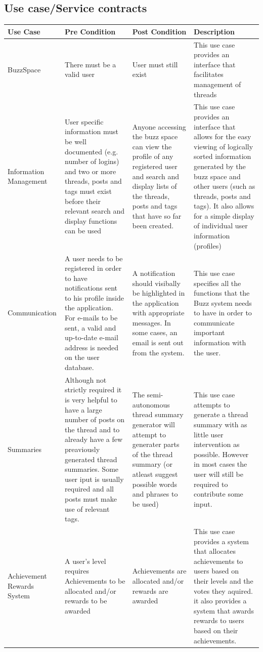 \documentclass[a4paper,12pt]{report}
\begin{document}
\subsection{Use case/Service contracts}
\begin{center}
  \begin{tabular}{| p{3cm} | p{4cm} | p{4cm} | p{4cm} |}
    \hline
    Use Case & Pre Condition & Post Condition & Description \\ \hline \hline
    BuzzSpace & There must be a valid user & User must still exist & This use case provides an interface that facilitates management of threads\\ \hline
    Information Management & User specific information must be well documented (e.g. number of logins) and two or more threads, posts and tags must exist before their relevant search and display functions can be used & Anyone accessing the buzz space can view the profile of any registered user and search and display lists of the threads, posts and tags that have so far been created.  & This use case provides an interface that allows for the easy viewing of logically sorted information generated by the buzz space and other users (such as threads, posts and tags). It also allows for a simple display of individual user information (profiles) \\ \hline
    Communication& A user needs to be registered in order to have notifications sent to his profile inside the application. For e-mails to be sent, a valid and up-to-date e-mail address is needed on the user database. & A notification should visibally be highlighted in the application with appropriate messages. In some cases, an email is sent out from the system. & This use case specifies all the functions that the Buzz system needs to have in order to communicate important information with the user. \\ \hline
    Summaries & Although not strictly required it is very helpful to have a large number of posts on the thread and to already have a few preaviously generated thread summaries. Some user iput is usually required and all posts must make use of relevant tags.  & The semi-autonomous thread summary generator will attempt to generater parts of the thread summary (or atleast suggest possible words and phrases to be used) & This use case attempts to generate a thread summary with as little user intervention as possible. However in most cases the user will still be required to contribute some input. \\ \hline
    Achievement Rewards System & A user's level requires Achievements to be allocated and/or rewards to be awarded & Achievements are allocated and/or rewards are awarded & This use case provides a system that allocates achievements to users based on their levels and the votes they aquired. it also provides a system that awards rewards to users based on their achievements.\\ \hline

\end{tabular}
\end{center}
\end{document}
